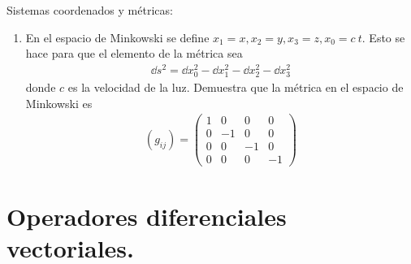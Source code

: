 \begin{ejer}{Sistemas coordenados y métricas:}
\begin{enumerate}
\begin{enumerate}[label=(\alph*)]
\end{enumerate}
\item En el espacio de Minkowski se define $x_{1} = x, x_{2} = y, x_{3} = z, x_{0} = c \: t$. Esto se hace para que el elemento de la métrica sea 
\begin{align*}
\dd{s^{2}} = \dd{x_{0}^{2}} - \dd{x_{1}^{2}} - \dd{x_{2}^{2}} - \dd{x_{3}^{2}}
\end{align*}
donde $c$ es la velocidad de la luz. Demuestra que la métrica en el espacio de Minkowski es
\begin{align*}
(g_{ij}) = \begin{pmatrix}
1 & 0 & 0 & 0 \\
0 & -1 & 0 & 0 \\
0 & 0 & -1 & 0 \\
0 & 0 & 0 & -1
\end{pmatrix}
\end{align*}
\end{enumerate}
\end{ejer}
 \section{Operadores diferenciales vectoriales.}
